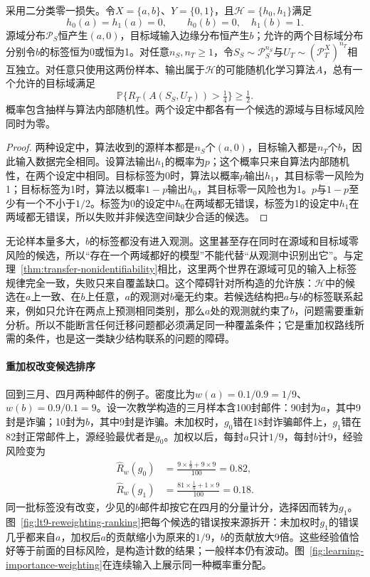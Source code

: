 \begin{theorem}[缺少覆盖时的不可学习性]
\label{thm:covariate-coverage-failure}
采用二分类零一损失。令$X=\{a,b\}$、$Y=\{0,1\}$，且$\mathcal H=\{h_0,h_1\}$满足
\[
 h_0(a)=h_1(a)=0,\qquad h_0(b)=0,\quad h_1(b)=1.
\]
源域分布$\mathcal P_S$恒产生$(a,0)$，目标域输入边缘分布恒产生$b$；允许的两个目标域分布分别令$b$的标签恒为0或恒为1。对任意$n_S,n_T\geq1$，令$S_S\sim\mathcal P_S^{n_S}$与$U_T\sim(\mathcal P_T^X)^{n_T}$相互独立。对任意只使用这两份样本、输出属于$\mathcal H$的可能随机化学习算法$A$，总有一个允许的目标域满足
\[
 \mathbb P\bigl\{R_T(A(S_S,U_T))>\tfrac14\bigr\}\geq\tfrac12 .
\]
概率包含抽样与算法内部随机性。两个设定中都各有一个候选的源域与目标域风险同时为零。
\end{theorem}
\begin{proof}
两种设定中，算法收到的源样本都是$n_S$个$(a,0)$，目标输入都是$n_T$个$b$，因此输入数据完全相同。设算法输出$h_1$的概率为$p$；这个概率只来自算法内部随机性，在两个设定中相同。目标标签为0时，算法以概率$p$输出$h_1$，其目标零一风险为1；目标标签为1时，算法以概率$1-p$输出$h_0$，其目标零一风险也为1。$p$与$1-p$至少有一个不小于$1/2$。标签为0的设定中$h_0$在两域都无错误，标签为1的设定中$h_1$在两域都无错误，所以失败并非候选空间缺少合适的候选。
\end{proof}

无论样本量多大，$b$的标签都没有进入观测。这里甚至存在同时在源域和目标域零风险的候选，所以“存在一个两域都好的模型”不能代替“从观测中识别出它”。与定理~\ref{thm:transfer-nonidentifiability}相比，这里两个世界在源域可见的输入上标签规律完全一致，失败只来自覆盖缺口。这个障碍针对所构造的允许族：$\mathcal H$中的候选在$a$上一致、在$b$上任意，$a$的观测对$b$毫无约束。若候选结构把$a$与$b$的标签联系起来，例如只允许在两点上预测相同类别，那么$a$处的观测就约束了$b$，问题需要重新分析。所以不能断言任何迁移问题都必须满足同一种覆盖条件；它是重加权路线所需的条件，也是这一类缺少结构联系的问题的障碍。

\paragraph{重加权改变候选排序}
回到三月、四月两种邮件的例子。密度比为$w(a)=0.1/0.9=1/9$、$w(b)=0.9/0.1=9$。设一次教学构造的三月样本含100封邮件：90封为$a$，其中9封是诈骗；10封为$b$，其中9封是诈骗。未加权时，$g_0$错在18封诈骗邮件上，$g_1$错在82封正常邮件上，源经验最优者是$g_0$。加权以后，每封$a$只计$1/9$，每封$b$计9，经验风险变为
\[
 \begin{aligned}
 \widehat R_w(g_0)&=\frac{9\times\frac19+9\times9}{100}=0.82,\\
 \widehat R_w(g_1)&=\frac{81\times\frac19+1\times9}{100}=0.18.
 \end{aligned}
\]
同一批标签没有改变，少见的$b$邮件却按它在四月的分量计分，选择因而转为$g_1$。图~\ref{fig:lt9-reweighting-ranking}把每个候选的错误按来源拆开：未加权时$g_1$的错误几乎都来自$a$，加权后$a$的贡献缩小为原来的$1/9$，$b$的贡献放大9倍。这些经验值恰好等于前面的目标风险，是构造计数的结果；一般样本仍有波动。图~\ref{fig:learning-importance-weighting}在连续输入上展示同一种概率重分配。

